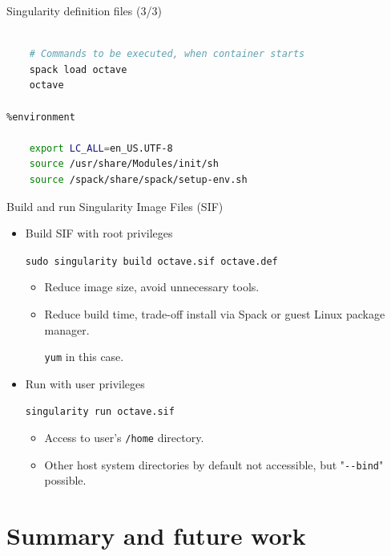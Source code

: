 \documentclass[xcolor=svgnames,xcolor=table,aspectratio=169]{beamer}
\begin{document}
\begin{frame}[fragile]{Singularity definition files (3/3)}
\begin{lstlisting}[xleftmargin=5em,language=Bash]
%runscript

    # Commands to be executed, when container starts
    spack load octave
    octave

%environment

    export LC_ALL=en_US.UTF-8
    source /usr/share/Modules/init/sh
    source /spack/share/spack/setup-env.sh
\end{lstlisting}
\end{frame}



\begin{frame}[fragile]{Build and run Singularity Image Files (SIF)}
\begin{itemize}
\itemsep1em
\item
Build SIF with root privileges

\texttt{\color{blue}sudo singularity build octave.sif octave.def}

\begin{itemize}
\itemsep1em
\item
Reduce image size, avoid unnecessary tools.

\item
Reduce build time, trade-off install via Spack or guest Linux package manager.

\texttt{yum} in this case.
\end{itemize}

\item
Run with user privileges

\texttt{\color{blue}singularity run octave.sif}

\begin{itemize}
\itemsep1em
\item
Access to user's \texttt{/home} directory.

\item
Other host system directories by default not accessible,
but "\verb|--bind|" possible.
\end{itemize}
\end{itemize}
\end{frame}



\section{Summary and future work}
\end{document}
